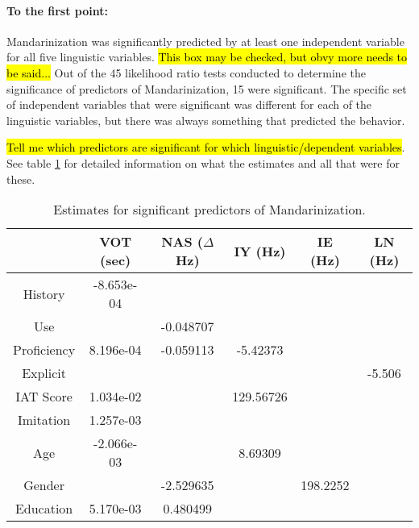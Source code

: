 \paragraph{To the first point:}

Mandarinization was significantly predicted by at least one independent variable for all five linguistic variables. \hl{This box may be checked, but obvy more needs to be said...} Out of the 45 likelihood ratio tests conducted to determine the significance of predictors of Mandarinization, 15 were significant. The specific set of independent variables that were significant was different for each of the linguistic variables, but there was always something that predicted the behavior.

\hl{Tell me which predictors are significant for which linguistic/dependent variables}. See table \ref{tab:sigMandPredEsts} for detailed information on what the estimates and all that were for these.

\begin{table}[]
    \centering
    \begin{tabular}{|cccccc|}
        \hline
         & VOT (sec) & NAS ($\Delta$Hz) & IY (Hz) & IE (Hz) & LN (Hz)\\
        \hline
        History & -8.653e-04 & \cellcolor{lightgray} & \cellcolor{lightgray} & \cellcolor{lightgray} & \cellcolor{lightgray} \\
        Use & \cellcolor{lightgray} & -0.048707 & \cellcolor{lightgray} & \cellcolor{lightgray} & \cellcolor{lightgray} \\
        Proficiency & 8.196e-04 & -0.059113 & -5.42373 & \cellcolor{lightgray} & \cellcolor{lightgray} \\
        Explicit & \cellcolor{lightgray} & \cellcolor{lightgray} & \cellcolor{lightgray} & \cellcolor{lightgray} & -5.506 \\
        IAT Score & 1.034e-02 & \cellcolor{lightgray} & 129.56726 & \cellcolor{lightgray} & \cellcolor{lightgray} \\
        Imitation & 1.257e-03 & \cellcolor{lightgray} & \cellcolor{lightgray} & \cellcolor{lightgray} & \cellcolor{lightgray} \\
        Age & -2.066e-03 & \cellcolor{lightgray} & 8.69309 & \cellcolor{lightgray} & \cellcolor{lightgray} \\
        Gender & \cellcolor{lightgray} & -2.529635 & \cellcolor{lightgray} & 198.2252 & \cellcolor{lightgray} \\
        Education & 5.170e-03 & 0.480499 & \cellcolor{lightgray} & \cellcolor{lightgray} & \cellcolor{lightgray} \\
        \hline
    \end{tabular}
    \caption{Estimates for significant predictors of Mandarinization.}
    \label{tab:sigMandPredEsts}
\end{table}

